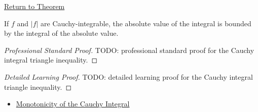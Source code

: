 \newpage
{}
\label{prf:cauchy-integral-triangle-inequality}

\begin{remark*}[Return]
\hyperref[thm:cauchy-integral-triangle-inequality]{Return to Theorem}
\end{remark*}

\begin{theorem*}
If \(f\) and \(|f|\) are Cauchy-integrable, the absolute value of the integral
is bounded by the integral of the absolute value.
\end{theorem*}

\begin{proof}[Professional Standard Proof]
\LRAProofBodyStart
TODO: professional standard proof for the Cauchy integral triangle inequality.
\end{proof}

\begin{proof}[Detailed Learning Proof]
\LRAProofBodyStart
TODO: detailed learning proof for the Cauchy integral triangle inequality.
\end{proof}

\begin{remark*}
\end{remark*}

\begin{dependencies}
\begin{itemize}
  \item \hyperref[thm:cauchy-integral-monotonicity]{Monotonicity of the Cauchy Integral}
\end{itemize}
\end{dependencies}

\clearpage
